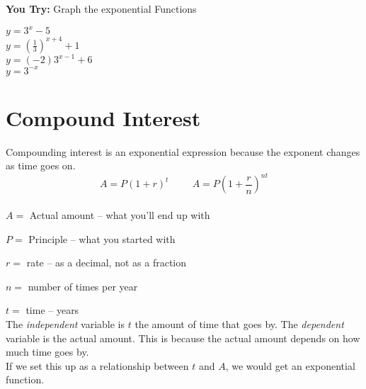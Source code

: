 \documentclass[12pt]{article}
\begin{document}
\pagebreak

\textbf{You Try:} Graph the exponential Functions\\

\begin{multicols}{2}
 $y=3^x-5$\\


 $y=\left(\frac{1}{3} \right)^{x+4}+1$\\


$y= (-2)3^{x-1}+6$\\


$y= 3^{-x}$\\





\end{multicols}

\pagebreak

\section*{Compound Interest}

Compounding interest is an exponential expression because the exponent changes as time goes on. \\


$$A=P(1+r)^t \hspace{1cm}  A=P\left(1+\frac{r}{n}\right)^{nt}$$\\

$A=$ Actual amount -- what you'll end up with

$P=$ Principle -- what you started with

$r=$ rate -- as a decimal, not as a fraction

$n=$ number of times per year

$t=$ time -- years\\

The \textit{independent} variable is $t$ the amount of time that goes by. The \textit{dependent} variable is the actual amount. This is because the actual amount depends on how much time goes by.\\ If we set this up as a relationship between $t$ and $A$, we would get an exponential function.
\end{document}
